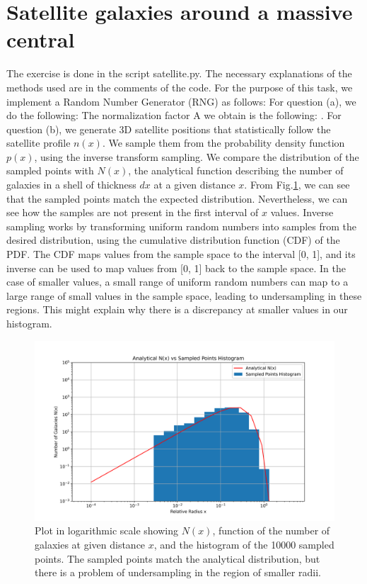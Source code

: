 %
\section{Satellite galaxies around a massive central}
The exercise is done in the script satellite.py. The necessary explanations of the methods used are in the comments of the code. For the purpose of this task, we implement a Random Number Generator (RNG) as follows: 
For question (a), we do the following:  The normalization factor A we obtain is the following: .
For question (b), we generate 3D satellite positions that statistically follow the satellite profile $n(x)$. We sample them from the probability density function $p(x)$, using the inverse transform sampling. We compare the distribution of the sampled points with $N(x)$, the analytical function describing the number of galaxies in a shell of thickness $dx$ at a given distance $x$. From Fig.\ref{fig:n_vs_hist}, we can see that the sampled points match the expected distribution. Nevertheless, we can see how the samples are not present in the first interval of $x$ values. Inverse sampling works by transforming uniform random numbers into samples from the desired distribution, using the cumulative distribution function (CDF) of the PDF. The CDF maps values from the sample space to the interval [0, 1], and its inverse can be used to map values from [0, 1] back to the sample space. In the case of smaller values, a small range of uniform random numbers can map to a large range of small values in the sample space, leading to undersampling in these regions. This might explain why there is a discrepancy at smaller values in our histogram.

\begin{figure}[h!]
  \centering
  \includegraphics[width=0.9\linewidth]{./plots/my_solution_1b.png}
  \caption{Plot in logarithmic scale showing $N(x)$, function of the number of galaxies at given distance $x$, and the histogram of the 10000 sampled points. The sampled points match the analytical distribution, but there is a problem of undersampling in the region of smaller radii.}
  \label{fig:n_vs_hist}
\end{figure}

